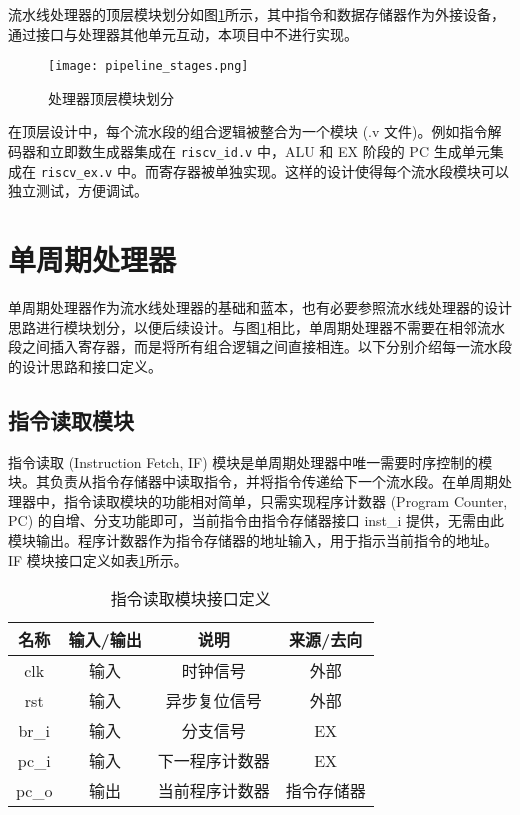 \documentclass[lang=zh]{sjtureport}
\begin{document}
流水线处理器的顶层模块划分如图\ref{fig:pipeline_stages}所示\cite{COD}，其中指令和数据存储器作为外接设备，通过接口与处理器其他单元互动，本项目中不进行实现。

\begin{figure}[!htp]
	\centering
	\texttt{[image: pipeline\_stages.png]}
	\caption{处理器顶层模块划分}
	\label{fig:pipeline_stages}
\end{figure}

在顶层设计中，每个流水段的组合逻辑被整合为一个模块 (.v 文件)。例如指令解码器和立即数生成器集成在 \texttt{riscv\_id.v} 中，ALU 和 EX 阶段的 PC 生成单元集成在 \texttt{riscv\_ex.v} 中。而寄存器被单独实现。这样的设计使得每个流水段模块可以独立测试，方便调试。

\section{单周期处理器}

单周期处理器作为流水线处理器的基础和蓝本，也有必要参照流水线处理器的设计思路进行模块划分，以便后续设计。与图\ref{fig:pipeline_stages}相比，单周期处理器不需要在相邻流水段之间插入寄存器，而是将所有组合逻辑之间直接相连。以下分别介绍每一流水段的设计思路和接口定义。

\subsection{指令读取模块}

指令读取 (Instruction Fetch, IF) 模块是单周期处理器中唯一需要时序控制的模块。其负责从指令存储器中读取指令，并将指令传递给下一个流水段。在单周期处理器中，指令读取模块的功能相对简单，只需实现程序计数器 (Program Counter, PC) 的自增、分支功能即可，当前指令由指令存储器接口 inst\_i 提供，无需由此模块输出。程序计数器作为指令存储器的地址输入，用于指示当前指令的地址。IF 模块接口定义如表\ref{tab:single_if_io}所示。

\begin{table}[!htp]
	\centering
	\caption{指令读取模块接口定义}
	\label{tab:single_if_io}
	\begin{tabular}{|c|c|c|c|}
		\hline
		名称 & 输入/输出 & 说明 & 来源/去向 \\
		\hline
		clk & 输入 & 时钟信号 & 外部 \\
		\hline
		rst & 输入 & 异步复位信号 & 外部 \\
		\hline
		br\_i & 输入 & 分支信号 & EX \\
		\hline
		pc\_i & 输入 & 下一程序计数器 & EX \\
		\hline
		pc\_o & 输出 & 当前程序计数器 & 指令存储器 \\
		\hline
	\end{tabular}
\end{table}
\end{document}
